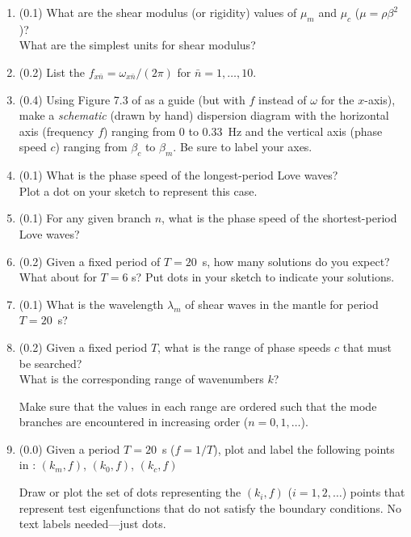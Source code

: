\documentclass[11pt,titlepage,fleqn]{article}
\newcommand{\cutoff}[1]{{#1}_{x\bar{n}}}
\begin{document}
\begin{enumerate}
\begin{enumerate}
\item (0.1) What are the shear modulus (or rigidity) values of $\mu_m$ and $\mu_c$ ($\mu = \rho\beta^2$)? \\
What are the simplest units for shear modulus?

\item (0.2) List the $\cutoff{f} = \cutoff{\omega}/(2\pi)$ for $\bar{n}=1,\ldots,10$.

\item (0.4) Using Figure 7.3 of \citet{AkiRichardsE2} as a guide (but with $f$ instead of $\omega$ for the $x$-axis), make a {\em schematic} (\ie drawn by hand) dispersion diagram with the horizontal axis (frequency $f$) ranging from 0 to 0.33~Hz and the vertical axis (phase speed $c$) ranging from $\beta_c$ to $\beta_m$. Be sure to label your axes.

\item (0.1) What is the phase speed of the longest-period Love waves? \\
Plot a dot on your sketch to represent this case.

\item (0.1) For any given branch $n$, what is the phase speed of the shortest-period Love waves?

\item (0.2) Given a fixed period of $T = 20$~s, how many solutions do you expect? \\
What about for $T = 6$ s? Put dots in your sketch to indicate your solutions.

\item (0.1) What is the wavelength $\lambda_m$ of shear waves in the mantle for period $T = 20$~s?

\item (0.2) Given a fixed period $T$, what is the range of phase speeds $c$ that must be searched? \\
What is the corresponding range of wavenumbers $k$?

Make sure that the values in each range are ordered such that the mode branches are encountered in increasing order ($n = 0,1,\ldots$).

\item (0.0) Given a period $T = 20$~s ($f = 1/T$), plot and label the following points in : $(k_m, f)$, $(k_0, f)$, $(k_c, f)$

Draw or plot the set of dots representing the $(k_i, f)$ ($i = 1,2,\ldots$) points that represent test eigenfunctions that do not satisfy the boundary conditions. No text labels needed---just dots.


\end{enumerate}
\end{enumerate}
\end{document}

